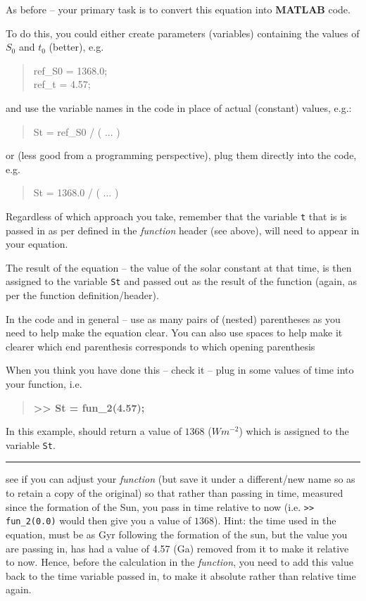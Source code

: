 \documentclass{tufte-book} %
\newenvironment{docspec}{\begin{quotation}\ttfamily\parskip0pt\parindent0pt\ignorespaces}{\end{quotation}}
\newenvironment{docspecbold}{\begin{quotation}\ttfamily\bfseries\parskip0pt\parindent0pt\ignorespaces}{\end{quotation}}
\begin{document}
As before -- your primary task is to convert this equation into \textbf{MATLAB} code. 

To do this, you could either create parameters (variables) containing the values of \(S_{0}\) and \(t_{0}\) (better), e.g.
\begin{docspec}
ref\_S0 = 1368.0;\\
ref\_t = 4.57;\\
\end{docspec}
and use the variable names in the code in place of actual (constant) values, e.g.:
\begin{docspec}
St = ref\_S0 / ( ... )
\end{docspec}
or (less good from a programming perspective), plug them directly into the code, e.g.
\begin{docspec}
St = 1368.0 / ( ... )
\end{docspec}
Regardless of which approach you take, remember that the variable \texttt{t} that is is passed in as per defined in the \textit{function} header (see above), will need to appear in your equation.

The result of the equation -- the value of the solar constant at that time, is then assigned to the variable \texttt{St} and passed out as the result of the function (again, as per the function definition/header).

In the code and in general -- use as many pairs of (nested) parentheses as you need to help make the equation clear. You can also use spaces to help make it clearer which end parenthesis corresponds to which opening parenthesis

When you think you have done this -- check it -- plug in some values of time into your function, i.e.
\begin{docspecbold}
>> St = fun\_2(4.57);
\end{docspecbold}
In this example, should return a value of \(1368\) (\(Wm^{-2}\)) which is assigned to the variable \texttt{St}.

\vspace{1mm}
\noindent\rule{4cm}{0.5pt}
\vspace{-2mm}

 see if you can adjust your \textit{function} (but save it under a different/new name so as to retain a copy of the original) so that rather than passing in time, measured since the formation of the Sun, you pass in time relative to now (i.e. \texttt{>> fun\_2(0.0)} would then give you a value of \(1368\)).
Hint: the time used in the equation, must be as Gyr following the formation of the sun, but the value you are passing in, has had a value of 4.57 (Ga) removed from it to make it relative to now. Hence, before the calculation in the \textit{function}, you need to add this value back to the time variable passed in, to make it absolute rather than relative time again.
\end{document}
